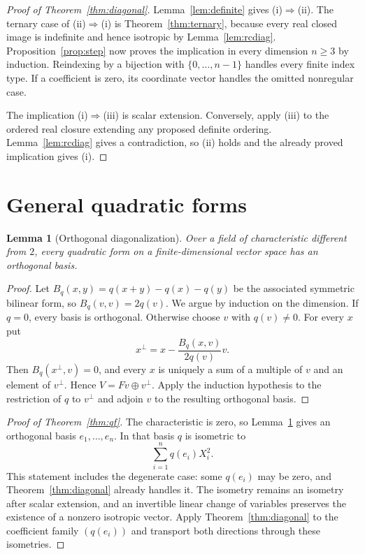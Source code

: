 \documentclass[uplatex,dvipdfmx]{jsarticle}
\newtheorem{lemma}[theorem]{Lemma}
\theoremstyle{definition}
\theoremstyle{remark}
\begin{document}
\begin{proof}[Proof of Theorem~\ref{thm:diagonal}]
Lemma~\ref{lem:definite} gives (i)$\Rightarrow$(ii).  The ternary case of
(ii)$\Rightarrow$(i) is Theorem~\ref{thm:ternary}, because every real closed
image is indefinite and hence isotropic by Lemma~\ref{lem:rcdiag}.
Proposition~\ref{prop:step} now proves the implication in every dimension
$n\ge3$ by induction.  Reindexing by a bijection with $\{0,\ldots,n-1\}$
handles every finite index type.  If a coefficient is zero, its coordinate
vector handles the omitted nonregular case.

The implication (i)$\Rightarrow$(iii) is scalar extension.  Conversely,
apply (iii) to the ordered real closure extending any proposed definite
ordering.  Lemma~\ref{lem:rcdiag} gives a contradiction, so (ii) holds and the
already proved implication gives (i).
\end{proof}

\section{General quadratic forms}

\begin{lemma}[Orthogonal diagonalization]\label{lem:diagonalization}
Over a field of characteristic different from $2$, every quadratic form on a
finite-dimensional vector space has an orthogonal basis.
\end{lemma}
\begin{proof}
Let $B_q(x,y)=q(x+y)-q(x)-q(y)$ be the associated symmetric bilinear form, so
$B_q(v,v)=2q(v)$.  We argue by induction on the dimension.  If $q=0$, every
basis is orthogonal.  Otherwise choose $v$ with $q(v)\ne0$.  For every $x$ put
\[
  x^\perp=x-\frac{B_q(x,v)}{2q(v)}v.
\]
Then $B_q(x^\perp,v)=0$, and every $x$ is uniquely a sum of a multiple of
$v$ and an element of $v^\perp$.  Hence
$V=Fv\oplus v^\perp$.  Apply the induction hypothesis to the restriction of
$q$ to $v^\perp$ and adjoin $v$ to the resulting orthogonal basis.
\end{proof}

\begin{proof}[Proof of Theorem~\ref{thm:qf}]
The characteristic is zero, so Lemma~\ref{lem:diagonalization} gives an
orthogonal basis $e_1,\ldots,e_n$.  In that basis $q$ is isometric to
\[
  \sum_{i=1}^n q(e_i)X_i^2.
\]
This statement includes the degenerate case: some $q(e_i)$ may be zero, and
Theorem~\ref{thm:diagonal} already handles it.  The isometry remains an
isometry after scalar extension, and an invertible linear change of variables
preserves the existence of a nonzero isotropic vector.  Apply
Theorem~\ref{thm:diagonal} to the coefficient family
$(q(e_i))$ and transport both directions through these isometries.
\end{proof}
\end{document}
